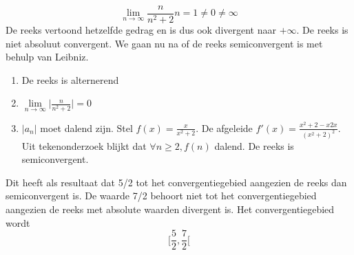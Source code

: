 {    $$\lim\limits_{n\to\infty} \frac{n}{n^2 + 2} n = 1 \neq 0 \neq \infty$$
    De reeks vertoond hetzelfde gedrag en is dus ook divergent naar $+\infty$. De reeks is niet absoluut convergent. We gaan nu na of de reeks semiconvergent is met behulp van Leibniz. 
    \begin{enumerate}
        \item De reeks is alternerend
        \item $\lim\limits_{n\to\infty} \big|\frac{n}{n^2 + 2}\big| = 0$
        \item $|a_n|$ moet dalend zijn. Stel $f(x) = \frac{x}{x^2 + 2}$. De afgeleide $f'(x) = \frac{x^2 + 2 - x2x}{(x^2 + 2)^2}$. Uit tekenonderzoek blijkt dat $\forall n \geq 2, f(n) $ dalend. De reeks is semiconvergent.
    \end{enumerate}
    Dit heeft als resultaat dat 5/2 tot het convergentiegebied aangezien de reeks dan semiconvergent is. De waarde 7/2 behoort niet tot het convergentiegebied aangezien de reeks met absolute waarden divergent is. Het convergentiegebied wordt
    $$\bigg[\frac{5}{2}, \frac{7}{2}\bigg[$$
}

